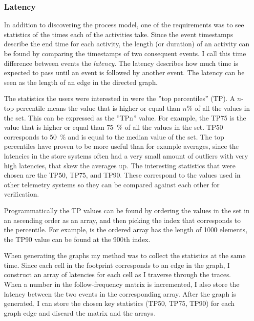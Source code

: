 
\subsubsection{Latency}
\label{sec:latency}

In addition to discovering the process model, one of the requirements was to see statistics of the times each of the activities take. 
Since the event timestamps describe the end time for each activity, the length (or duration) of an activity can be found by comparing the timestamps of two consequent events. 
I call this time difference between events the \emph{latency}.
The latency describes how much time is expected to pass until an event is followed by another event.
The latency can be seen as the length of an edge in the directed graph.

The statistics the users were interested in were the ''top percentiles'' (TP).
A $n$-top percentile means the value that is higher or equal than $n\%$ of all the values in the set.
This can be expressed as the ''TPn'' value.
For example, the TP75 is the value that is higher or equal than 75~\% of all the values in the set.
TP50 corresponds to 50~\% and is equal to the median value of the set.
The top percentiles have proven to be more useful than for example averages, since the latencies 
in the store systems often had a very small amount of outliers with very high latencies, that skew the 
averages up.
The interesting statistics that were chosen are the TP50, TP75, and TP90. 
These correspond to the values used in other telemetry systems so they can be compared against each other for verification.

Programmatically the TP values can be found by ordering the values in the set in an ascending order as an array, and then picking the index that corresponds to the percentile. For example, is the ordered array has the length of 1000 elements, the TP90 value can be found at the 900th index.

When generating the graphs my method was to collect the statistics at the same time.
Since each cell in the footprint corresponds to an edge in the graph, I construct an array of latencies for each cell as I traverse through the traces.
When a number in the follow-frequency matrix is incremented, I also store the latency between the two events in the corresponding array. 
After the graph is generated, I can store the chosen key statistics (TP50, TP75, TP90) for each graph edge and discard the matrix and the arrays.

